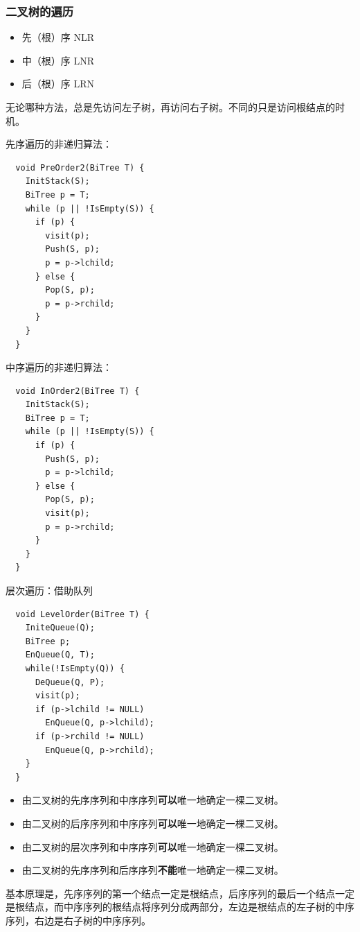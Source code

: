 \documentclass[12pt, a4paper, oneside]{ctexart}
\begin{document}
\subsubsection{二叉树的遍历}

\begin{itemize}
  \item 先（根）序 NLR
  \item 中（根）序 LNR
  \item 后（根）序 LRN
\end{itemize}

无论哪种方法，总是先访问左子树，再访问右子树。不同的只是访问根结点的时机。

先序遍历的非递归算法：
\begin{lstlisting}
  void PreOrder2(BiTree T) {
    InitStack(S);
    BiTree p = T;
    while (p || !IsEmpty(S)) {
      if (p) {
        visit(p);
        Push(S, p);
        p = p->lchild;
      } else {
        Pop(S, p);
        p = p->rchild;
      }
    }
  }
\end{lstlisting}

中序遍历的非递归算法：
\begin{lstlisting}
  void InOrder2(BiTree T) {
    InitStack(S);
    BiTree p = T;
    while (p || !IsEmpty(S)) {
      if (p) {
        Push(S, p);
        p = p->lchild;
      } else {
        Pop(S, p);
        visit(p);
        p = p->rchild;
      }
    }
  }
\end{lstlisting}

层次遍历：借助队列
\begin{lstlisting}
  void LevelOrder(BiTree T) {
    IniteQueue(Q);
    BiTree p;
    EnQueue(Q, T);
    while(!IsEmpty(Q)) {
      DeQueue(Q, P);
      visit(p);
      if (p->lchild != NULL)
        EnQueue(Q, p->lchild);
      if (p->rchild != NULL)
        EnQueue(Q, p->rchild);
    }
  }
\end{lstlisting}

\begin{itemize}
  \item 由二叉树的先序序列和中序序列\textbf{可以}唯一地确定一棵二叉树。
  \item 由二叉树的后序序列和中序序列\textbf{可以}唯一地确定一棵二叉树。
  \item 由二叉树的层次序列和中序序列\textbf{可以}唯一地确定一棵二叉树。
  \item 由二叉树的先序序列和后序序列\textbf{不能}唯一地确定一棵二叉树。
\end{itemize}

基本原理是，先序序列的第一个结点一定是根结点，后序序列的最后一个结点一定是根结点，而中序序列的根结点将序列分成两部分，左边是根结点的左子树的中序序列，右边是右子树的中序序列。
\end{document}
